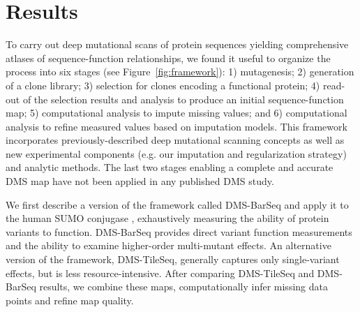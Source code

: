 \section{Results}

To carry out deep mutational scans of protein sequences yielding comprehensive atlases of sequence-function relationships, we found it useful to organize the process into six stages (see Figure~\ref{fig:framework}): 1) mutagenesis; 2) generation of a clone library; 3) selection for clones encoding a functional protein; 4) read-out of the selection results and analysis to produce an initial sequence-function map; 5) computational analysis to impute missing values; and 6) computational analysis to refine measured values based on imputation models. This framework incorporates previously-described deep mutational scanning concepts as well as new experimental components (e.g. our imputation and regularization strategy) and analytic methods.  The last two stages enabling a complete and accurate DMS map have not been applied in any published DMS study.

We first describe a version of the framework called DMS-BarSeq and apply it to the human SUMO conjugase , exhaustively measuring the ability of protein variants to function. DMS-BarSeq provides direct variant function measurements and the ability to examine higher-order multi-mutant effects. An alternative version of the framework, DMS-TileSeq, generally captures only single-variant effects, but is less resource-intensive. After comparing DMS-TileSeq and DMS-BarSeq results, we combine these maps, computationally infer missing data points and refine map quality.


